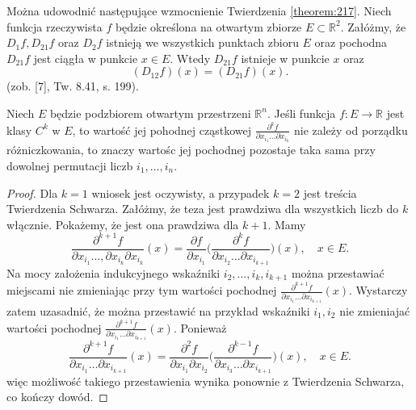 \documentclass[leqno]{article}
\begin{document}
\begin{justify}
\begin{uwaga}
    Można udowodnić następujące wzmocnienie Twierdzenia \ref{theorem:217}. Niech funkcja rzeczywista $f$ będzie określona na otwartym 
    zbiorze $E \subset \mathbb{R}^2$. Załóżmy, że $D_1 f, D_{21} f$ oraz $D_2 f$ istnieją we wszystkich punktach zbioru $E$ oraz pochodna $D_{21} f$ jest ciągła w punkcie 
    $x \in E$. Wtedy $D_{21} f$ istnieje w punkcie $x$ oraz 
    \[
        (D_{12} f)(x) = (D_{21} f)(x).
    \]
    (zob. [7], Tw. 8.41, s. 199).
\end{uwaga}

\begin{wniosek}
{
    Niech $E$ będzie podzbiorem otwartym przestrzeni $\mathbb{R}^n$. Jeśli funkcja $f : E \to \mathbb{R}$ jest klasy $C^k$ w $E$, to wartość jej
    pohodnej cząstkowej $\frac{\partial ^k f}{\partial x_{i_1} \ldots \partial x_{i_k}}$ nie zależy od porządku różniczkowania, to znaczy wartośc jej pochodnej pozostaje taka sama 
    przy dowolnej permutacji liczb $i_1, \ldots, i_n$.
}
\end{wniosek}

\begin{proof}
    Dla $k = 1$ wniosek jest oczywisty, a przypadek $k = 2$ jest treścia Twierdzenia Schwarza. Załóżmy, że teza jest prawdziwa dla wszystkich liczb do $k$ włącznie.
    Pokażemy, że jest ona prawdziwa dla $k + 1$. Mamy 
    \[
        \frac{\partial ^ {k+1} f}{\partial x_{i_1} \ldots, \partial x_{i_k} \partial x_{i_k}}(x) = \frac{\partial f}{\partial x_{i_1}}\Big(\frac{\partial ^ k f}{\partial x_{i_2} \ldots \partial x_{i_{k+1}}}\Big)(x),
        \quad x \in E.
    \]
    Na mocy założenia indukcyjnego wskaźniki $i_2, \ldots, i_k, i_{k+1}$ można przestawiać miejscami nie zmieniając przy tym wartości pochodnej
    $\frac{\partial ^{k+1} f}{\partial x_{i_1} \ldots \partial x_{i_{k+1}}}(x)$. Wystarczy zatem uzasadnić, że można przestawić na przykład wskaźniki $i_1, i_2$ nie zmieniajać wartości pochodnej
    $\frac{\partial ^{k+1} f}{\partial x_{i_1} \ldots \partial x_{i_{k+1}}}(x)$. Ponieważ 
    \[
        \frac{\partial ^{k+1} f}{\partial x_{i_1} \ldots \partial x_{i_{k+1}}}(x) = \frac{\partial ^2 f}{\partial x_{i_1} \partial x_{i_2}} \Big(\frac{\partial ^{k-1} f}{\partial x_{i_3} \ldots \partial x_{i_{k+1}}}\Big)(x), \quad x \in E.
    \]
    więc możliwość takiego przestawienia wynika ponownie z Twierdzenia Schwarza, co kończy dowód.
\end{proof}


\end{justify}
\end{document}
